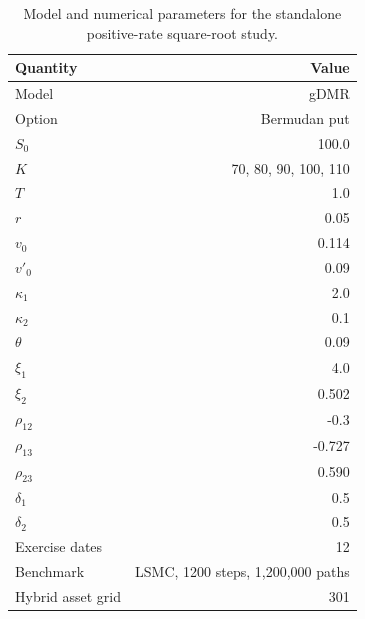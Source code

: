 \begin{table}[htbp]
\centering
\caption{Model and numerical parameters for the standalone positive-rate square-root study.}
\label{tab:bgk_r05_v0114_vp009_t1_delta05_nex12-experimental-setting}
\begin{tabular}{lr}
\toprule
Quantity & Value \\
\midrule
Model & gDMR \\
Option & Bermudan put \\
$S_0$ & 100.0 \\
$K$ & 70, 80, 90, 100, 110 \\
$T$ & 1.0 \\
$r$ & 0.05 \\
$v_0$ & 0.114 \\
$v'_0$ & 0.09 \\
$\kappa_1$ & 2.0 \\
$\kappa_2$ & 0.1 \\
$\theta$ & 0.09 \\
$\xi_1$ & 4.0 \\
$\xi_2$ & 0.502 \\
$\rho_{12}$ & -0.3 \\
$\rho_{13}$ & -0.727 \\
$\rho_{23}$ & 0.590 \\
$\delta_1$ & 0.5 \\
$\delta_2$ & 0.5 \\
Exercise dates & 12 \\
Benchmark & LSMC, 1200 steps, 1,200,000 paths \\
Hybrid asset grid & 301 \\
\bottomrule
\end{tabular}
\end{table}
